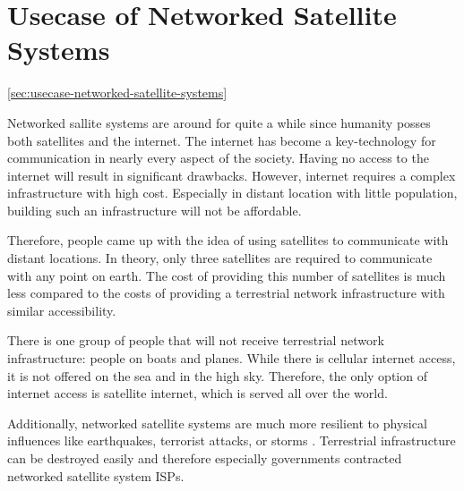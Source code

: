 \section{Usecase of Networked Satellite Systems} \ref{sec:usecase-networked-satellite-systems}

Networked sallite systems are around for quite a while since humanity posses both satellites and the internet.
The internet has become a key-technology for communication in nearly every aspect of the society.
Having no access to the internet will result in significant drawbacks. 
However, internet requires a complex infrastructure with high cost. Especially in distant location with little population, building such an infrastructure will not be affordable.

Therefore, people came up with the idea of using satellites to communicate with distant locations.
In theory, only three satellites are required to communicate with any point on earth. 
The cost of providing this number of satellites is much less compared to the costs of providing a terrestrial network infrastructure with similar accessibility.

There is one group of people that will not receive terrestrial network infrastructure: people on boats and planes.
While there is cellular internet access, it is not offered on the sea and in the high sky.
Therefore, the only option of internet access is satellite internet, which is served all over the world.

Additionally, networked satellite systems are much more resilient to physical influences like earthquakes, terrorist attacks, or storms \cite{DBLP:conf/pam/StevensIBD24}.
Terrestrial infrastructure can be destroyed easily and therefore especially governments contracted networked satellite system ISPs.


